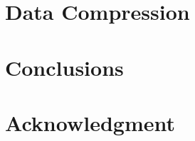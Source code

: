 \documentclass[conference]{IEEEtran}
\begin{document}
\section{Data Compression}

\section{Conclusions}



\section*{Acknowledgment}




\end{document}

